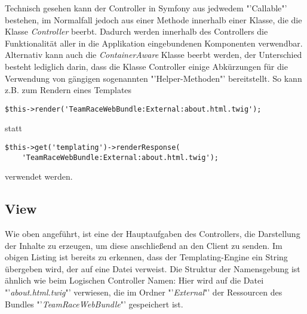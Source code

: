 \documentclass[12pt]{report}
\begin{document}
Technisch gesehen kann der Controller in Symfony aus jedwedem "'Callable"' bestehen, im Normalfall jedoch aus einer Methode innerhalb einer Klasse, die die Klasse \emph{Controller} beerbt. Dadurch werden innerhalb des Controllers die Funktionalität aller in die Applikation eingebundenen Komponenten verwendbar. Alternativ kann auch die \emph{ContainerAware} Klasse beerbt werden, der Unterschied besteht lediglich darin, dass die Klasse Controller einige Abkürzungen für die Verwendung von gängigen sogenannten "'Helper-Methoden"' bereitstellt. So kann z.B. zum Rendern eines Templates

\begin{lstlisting}
$this->render('TeamRaceWebBundle:External:about.html.twig');
\end{lstlisting}
statt 
\begin{lstlisting}
$this->get('templating')->renderResponse(
	'TeamRaceWebBundle:External:about.html.twig');
\end{lstlisting}
verwendet werden.

\subsection{View}

Wie oben angeführt, ist eine der Hauptaufgaben des Controllers, die Darstellung der Inhalte zu erzeugen, um diese anschließend an den Client zu senden. Im obigen Listing ist bereits zu erkennen, dass der Templating-Engine ein String übergeben wird, der auf eine Datei verweist. Die Struktur der Namensgebung ist ähnlich wie beim Logischen Controller Namen: Hier wird auf die Datei "'\emph{about.html.twig}"' verwiesen, die im Ordner "'\emph{External}"' der Ressourcen des Bundles "'\emph{TeamRaceWebBundle}"' gespeichert ist.
\end{document}
